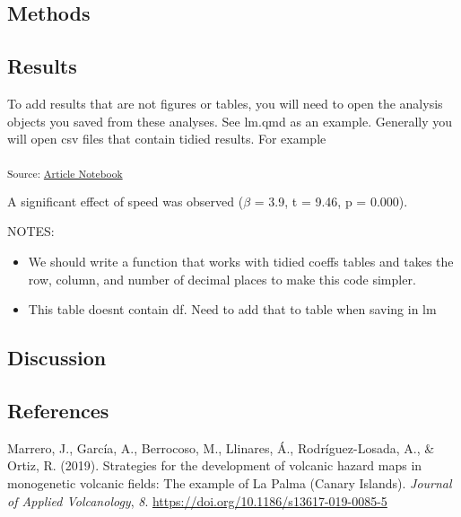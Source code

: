 \documentclass[
]{agujournal2019}
\providecommand{\tightlist}{%
  \setlength{\itemsep}{0pt}\setlength{\parskip}{0pt}}\usepackage{longtable,booktabs,array}
\newlength{\cslhangindent}
\newenvironment{CSLReferences}[2] %
 {\begin{list}{}{%
  \setlength{\itemindent}{0pt}
  \setlength{\leftmargin}{0pt}
  \setlength{\parsep}{0pt}
  \ifodd #1
   \setlength{\leftmargin}{\cslhangindent}
   \setlength{\itemindent}{-1\cslhangindent}
  \fi
  \setlength{\itemsep}{#2\baselineskip}}}
 {\end{list}}
\begin{document}
\subsection{Methods}\label{sec-methods}

\subsection{Results}\label{sec-results}

To add results that are not figures or tables, you will need to open the
analysis objects you saved from these analyses. See lm.qmd as an
example. Generally you will open csv files that contain tidied results.
For example

\textsubscript{Source:
\href{https://jjcurtin.github.io/study_template/index.qmd.html}{Article
Notebook}}

A significant effect of speed was observed (\(\beta\) = 3.9, t = 9.46, p
= 0.000).

NOTES:

\begin{itemize}
\tightlist
\item
  We should write a function that works with tidied coeffs tables and
  takes the row, column, and number of decimal places to make this code
  simpler.
\item
  This table doesnt contain df. Need to add that to table when saving in
  lm
\end{itemize}

\subsection{Discussion}\label{sec-discussion}

\subsection*{References}\label{references-1}

\label{refs}
\begin{CSLReferences}{1}{0}
\vspace{1em}

Marrero, J., García, A., Berrocoso, M., Llinares, Á., Rodríguez-Losada,
A., \& Ortiz, R. (2019). Strategies for the development of volcanic
hazard maps in monogenetic volcanic fields: The example of {La} {Palma}
({Canary} {Islands}). \emph{Journal of Applied Volcanology}, \emph{8}.
\url{https://doi.org/10.1186/s13617-019-0085-5}

\end{CSLReferences}
\end{document}
